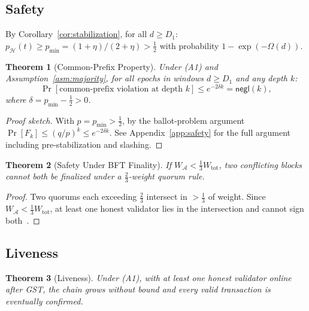 \documentclass[10pt,journal,twoside]{IEEEtran}
\newtheorem{theorem}{Theorem}[section]
\theoremstyle{remark}
\newcommand{\negl}{\mathsf{negl}}
\begin{document}
	\subsection{Safety}
	\label{ssec:safety}
	
	By Corollary~\ref{cor:stabilization}, for all $d \geq D_1$:
	$p_{\mathcal{H}}(t) \geq p_{\min} = (1+\eta)/(2+\eta)
	> \tfrac{1}{2}$ with probability $1 - \exp(-\Omega(d))$.
	
	\begin{theorem}[Common-Prefix Property]
		\label{thm:safety}
		Under (A1) and Assumption~\ref{asm:majority}, for all
		epochs in windows $d \geq D_1$ and any depth $k$:
		\[
		\Pr[\text{common-prefix violation at depth } k]
		\leq e^{-2\delta k} = \negl(k),
		\]
		where $\delta = p_{\min} - \tfrac{1}{2} > 0$.
	\end{theorem}
	
	\begin{proof}[Proof sketch]
		With $p = p_{\min} > \tfrac{1}{2}$, by the
		ballot-problem argument
		$\Pr[F_k] \leq (q/p)^k \leq e^{-2\delta k}$.
		See Appendix~\ref{app:safety} for the full argument
		including pre-stabilization and slashing.
	\end{proof}
	
	\begin{theorem}[Safety Under BFT Finality]
		\label{thm:bft-safety}
		If $W_{\mathcal{A}} < \tfrac{1}{3}W_{\mathrm{tot}}$,
		two conflicting blocks cannot both be finalized under
		a $\tfrac{2}{3}$-weight quorum rule.
	\end{theorem}
	
	\begin{proof}
		Two quorums each exceeding $\tfrac{2}{3}$ intersect
		in $>\tfrac{1}{3}$ of weight.
		Since $W_{\mathcal{A}} < \tfrac{1}{3}W_{\mathrm{tot}}$,
		at least one honest validator lies in the intersection
		and cannot sign both~\cite{castro1999pbft,yin2019hotstuff}.
	\end{proof}
	
	\subsection{Liveness}
	\label{ssec:liveness}
	
	\begin{theorem}[Liveness]
		\label{thm:liveness}
		Under (A1), with at least one honest validator online
		after GST, the chain grows without bound and every
		valid transaction is eventually confirmed.
	\end{theorem}
	
\end{document}

